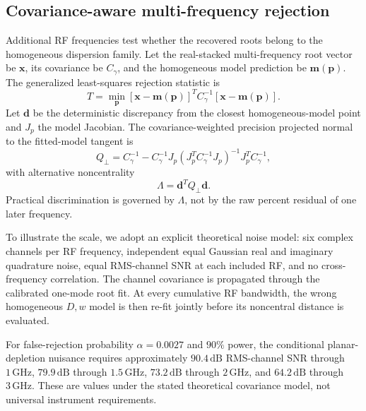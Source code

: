 \documentclass[aps,pra,twocolumn,superscriptaddress,nofootinbib]{revtex4-2}
\begin{document}


\subsection{Covariance-aware multi-frequency rejection}

Additional RF frequencies test whether the recovered roots belong to the homogeneous dispersion family. Let the real-stacked multi-frequency root vector be $\bm x$, its covariance be $C_\gamma$, and the homogeneous model prediction be $\bm m(\bm p)$. The generalized least-squares rejection statistic is
\begin{equation}
\boxed{
T=\min_{\bm p}
[\bm x-\bm m(\bm p)]^T
C_\gamma^{-1}
[\bm x-\bm m(\bm p)].
}
\label{eq:teststat}
\end{equation}
Let $\bm d$ be the deterministic discrepancy from the closest homogeneous-model point and $J_p$ the model Jacobian. The covariance-weighted precision projected normal to the fitted-model tangent is
\begin{equation}
Q_\perp=C_\gamma^{-1}
-C_\gamma^{-1}J_p
(J_p^TC_\gamma^{-1}J_p)^{-1}
J_p^TC_\gamma^{-1},
\end{equation}
with alternative noncentrality
\begin{equation}
\boxed{
\Lambda=\bm d^TQ_\perp\bm d.
}
\label{eq:lambda}
\end{equation}
Practical discrimination is governed by $\Lambda$, not by the raw percent residual of one later frequency.

To illustrate the scale, we adopt an explicit theoretical noise model: six complex channels per RF frequency, independent equal Gaussian real and imaginary quadrature noise, equal RMS-channel SNR at each included RF, and no cross-frequency correlation. The channel covariance is propagated through the calibrated one-mode root fit. At every cumulative RF bandwidth, the wrong homogeneous $D,w$ model is then re-fit jointly before its noncentral distance is evaluated.

For false-rejection probability $\alpha=0.0027$ and $90\%$ power, the conditional planar-depletion nuisance requires approximately $90.4\,\mathrm{dB}$ RMS-channel SNR through $1\,\mathrm{GHz}$, $79.9\,\mathrm{dB}$ through $1.5\,\mathrm{GHz}$, $73.2\,\mathrm{dB}$ through $2\,\mathrm{GHz}$, and $64.2\,\mathrm{dB}$ through $3\,\mathrm{GHz}$. These are values under the stated theoretical covariance model, not universal instrument requirements.
\end{document}
